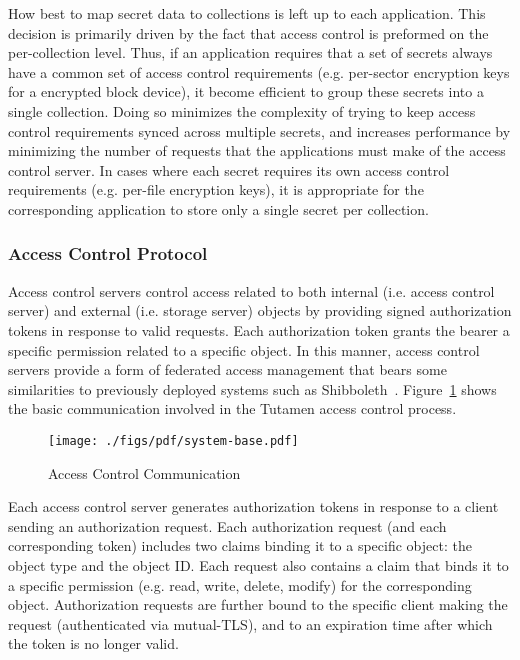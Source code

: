 How best to map secret data to collections is left up to each
application. This decision is primarily driven by the fact that access
control is preformed on the per-collection level. Thus, if an
application requires that a set of secrets always have a common set
of access control requirements (e.g. per-sector encryption keys for a
encrypted block device), it become efficient to group these secrets
into a single collection. Doing so minimizes the complexity of trying
to keep access control requirements synced across multiple secrets, and
increases performance by minimizing the number of requests that the
applications must make of the access control server. In cases where
each secret requires its own access control requirements
(e.g. per-file encryption keys), it is appropriate for the
corresponding application to store only a single secret per
collection.

\subsubsection{Access Control Protocol}
\label{sec:tutamen:arch:acp}

Access control servers control access related to both internal
(i.e. access control server) and external (i.e. storage server)
objects by providing signed authorization tokens in response to valid
requests. Each authorization token grants the bearer a specific
permission related to a specific object. In this manner, access
control servers provide a form of federated access management that
bears some similarities to previously deployed systems such as
Shibboleth~\cite{leandro2012}. Figure~\ref{fig:tutamen:systembase}
shows the basic communication involved in the Tutamen access control
process.

\begin{figure}[th]
  \centering
  \texttt{[image: ./figs/pdf/system-base.pdf]}
  \caption{Access Control Communication}
  \label{fig:tutamen:systembase}
\end{figure}

Each access control server generates authorization tokens in response
to a client sending an authorization request. Each authorization
request (and each corresponding token) includes two claims binding it
to a specific object: the object type and the object ID. Each request
also contains a claim that binds it to a specific permission
(e.g. read, write, delete, modify) for the corresponding
object. Authorization requests are further bound to the specific
client making the request (authenticated via mutual-TLS), and to an
expiration time after which the token is no longer valid.

